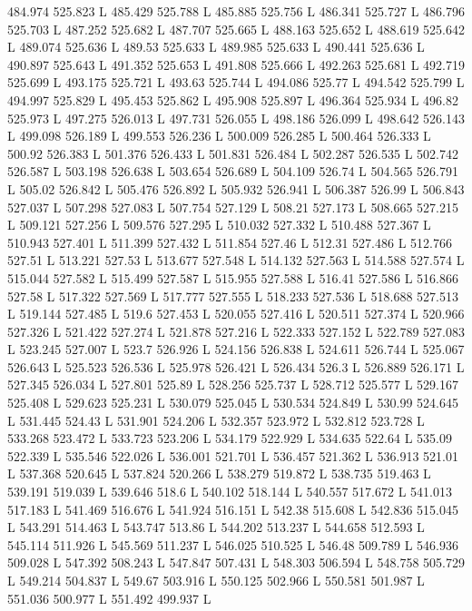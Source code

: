 484.974 525.823 L
485.429 525.788 L
485.885 525.756 L
486.341 525.727 L
486.796 525.703 L
487.252 525.682 L
487.707 525.665 L
488.163 525.652 L
488.619 525.642 L
489.074 525.636 L
489.53 525.633 L
489.985 525.633 L
490.441 525.636 L
490.897 525.643 L
491.352 525.653 L
491.808 525.666 L
492.263 525.681 L
492.719 525.699 L
493.175 525.721 L
493.63 525.744 L
494.086 525.77 L
494.542 525.799 L
494.997 525.829 L
495.453 525.862 L
495.908 525.897 L
496.364 525.934 L
496.82 525.973 L
497.275 526.013 L
497.731 526.055 L
498.186 526.099 L
498.642 526.143 L
499.098 526.189 L
499.553 526.236 L
500.009 526.285 L
500.464 526.333 L
500.92 526.383 L
501.376 526.433 L
501.831 526.484 L
502.287 526.535 L
502.742 526.587 L
503.198 526.638 L
503.654 526.689 L
504.109 526.74 L
504.565 526.791 L
505.02 526.842 L
505.476 526.892 L
505.932 526.941 L
506.387 526.99 L
506.843 527.037 L
507.298 527.083 L
507.754 527.129 L
508.21 527.173 L
508.665 527.215 L
509.121 527.256 L
509.576 527.295 L
510.032 527.332 L
510.488 527.367 L
510.943 527.401 L
511.399 527.432 L
511.854 527.46 L
512.31 527.486 L
512.766 527.51 L
513.221 527.53 L
513.677 527.548 L
514.132 527.563 L
514.588 527.574 L
515.044 527.582 L
515.499 527.587 L
515.955 527.588 L
516.41 527.586 L
516.866 527.58 L
517.322 527.569 L
517.777 527.555 L
518.233 527.536 L
518.688 527.513 L
519.144 527.485 L
519.6 527.453 L
520.055 527.416 L
520.511 527.374 L
520.966 527.326 L
521.422 527.274 L
521.878 527.216 L
522.333 527.152 L
522.789 527.083 L
523.245 527.007 L
523.7 526.926 L
524.156 526.838 L
524.611 526.744 L
525.067 526.643 L
525.523 526.536 L
525.978 526.421 L
526.434 526.3 L
526.889 526.171 L
527.345 526.034 L
527.801 525.89 L
528.256 525.737 L
528.712 525.577 L
529.167 525.408 L
529.623 525.231 L
530.079 525.045 L
530.534 524.849 L
530.99 524.645 L
531.445 524.43 L
531.901 524.206 L
532.357 523.972 L
532.812 523.728 L
533.268 523.472 L
533.723 523.206 L
534.179 522.929 L
534.635 522.64 L
535.09 522.339 L
535.546 522.026 L
536.001 521.701 L
536.457 521.362 L
536.913 521.01 L
537.368 520.645 L
537.824 520.266 L
538.279 519.872 L
538.735 519.463 L
539.191 519.039 L
539.646 518.6 L
540.102 518.144 L
540.557 517.672 L
541.013 517.183 L
541.469 516.676 L
541.924 516.151 L
542.38 515.608 L
542.836 515.045 L
543.291 514.463 L
543.747 513.86 L
544.202 513.237 L
544.658 512.593 L
545.114 511.926 L
545.569 511.237 L
546.025 510.525 L
546.48 509.789 L
546.936 509.028 L
547.392 508.243 L
547.847 507.431 L
548.303 506.594 L
548.758 505.729 L
549.214 504.837 L
549.67 503.916 L
550.125 502.966 L
550.581 501.987 L
551.036 500.977 L
551.492 499.937 L
